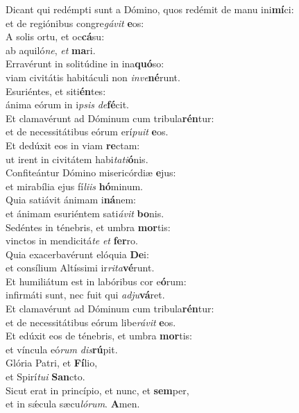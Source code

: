 \evenverse Dicant qui redémpti sunt a Dómino, quos redémit de manu ini\textbf{mí}ci:~\*\\
\evenverse et de regiónibus congre\textit{gá}\textit{vit} \textbf{e}os:\\
\oddverse A solis ortu, et oc\textbf{cá}su:~\*\\
\oddverse ab aquiló\textit{ne}, \textit{et} \textbf{ma}ri.\\
\evenverse Erravérunt in solitúdine in ina\textbf{quó}so:~\*\\
\evenverse viam civitátis habitáculi non \textit{in}\textit{ve}\textbf{né}runt.\\
\oddverse Esuriéntes, et siti\textbf{én}tes:~\*\\
\oddverse ánima eórum in i\textit{psis} \textit{de}\textbf{fé}cit.\\
\evenverse Et clamavérunt ad Dóminum cum tribula\textbf{rén}tur:~\*\\
\evenverse et de necessitátibus eórum erí\textit{pu}\textit{it} \textbf{e}os.\\
\oddverse Et dedúxit eos in viam \textbf{re}ctam:~\*\\
\oddverse ut irent in civitátem habi\textit{ta}\textit{ti}\textbf{ó}nis.\\
\evenverse Confiteántur Dómino misericórdiæ \textbf{e}jus:~\*\\
\evenverse et mirabília ejus fí\textit{li}\textit{is} \textbf{hó}minum.\\
\oddverse Quia satiávit ánimam i\textbf{ná}nem:~\*\\
\oddverse et ánimam esuriéntem sati\textit{á}\textit{vit} \textbf{bo}nis.\\
\evenverse Sedéntes in ténebris, et umbra \textbf{mor}tis:~\*\\
\evenverse vinctos in mendicitá\textit{te} \textit{et} \textbf{fer}ro.\\
\oddverse Quia exacerbavérunt elóquia \textbf{De}i:~\*\\
\oddverse et consílium Altíssimi ir\textit{ri}\textit{ta}\textbf{vé}runt.\\
\evenverse Et humiliátum est in labóribus cor e\textbf{ó}rum:~\*\\
\evenverse infirmáti sunt, nec fuit qui \textit{ad}\textit{ju}\textbf{vá}ret.\\
\oddverse Et clamavérunt ad Dóminum cum tribula\textbf{rén}tur:~\*\\
\oddverse et de necessitátibus eórum libe\textit{rá}\textit{vit} \textbf{e}os.\\
\evenverse Et edúxit eos de ténebris, et umbra \textbf{mor}tis:~\*\\
\evenverse et víncula eó\textit{rum} \textit{dis}\textbf{rú}pit.\\
\oddverse Glória Patri, et \textbf{Fí}lio,~\*\\
\oddverse et Spirí\textit{tu}\textit{i} \textbf{San}cto.\\
\evenverse Sicut erat in princípio, et nunc, et \textbf{sem}per,~\*\\
\evenverse et in sǽcula sæcu\textit{ló}\textit{rum}. \textbf{A}men.\\

